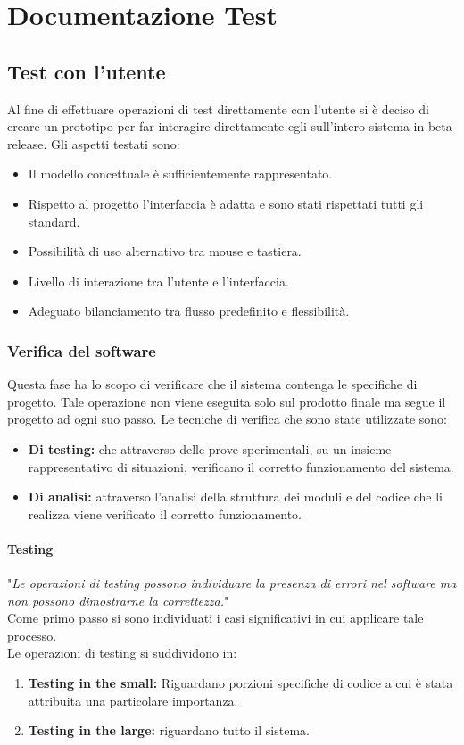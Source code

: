 \documentclass[a4paper,final,12pt]{report}
\begin{document}
\chapter{Documentazione Test}

\section{Test con l'utente}
Al fine di effettuare operazioni di test direttamente con l'utente si è deciso di creare un prototipo per far interagire direttamente egli sull'intero sistema in beta-release.
Gli aspetti testati sono:
\begin{itemize}
\item Il modello concettuale è sufficientemente rappresentato.
\item Rispetto al progetto l'interfaccia è adatta e sono stati rispettati tutti gli standard.
\item Possibilità di uso alternativo tra mouse e tastiera.
\item Livello di interazione tra l'utente e l'interfaccia.
\item Adeguato bilanciamento tra flusso predefinito e flessibilità.
\end{itemize}

\subsection{Verifica del software}
Questa fase ha lo scopo di verificare che il sistema contenga le specifiche di progetto. Tale operazione non viene eseguita solo sul prodotto finale ma segue il progetto ad ogni suo passo.
Le tecniche di verifica che sono state utilizzate sono:
\begin{itemize}
\item \textbf{Di testing:} che attraverso delle prove sperimentali, su un insieme rappresentativo di situazioni, verificano il corretto funzionamento del sistema. 
\item \textbf{Di analisi:} attraverso l'analisi della struttura dei moduli e del codice che li realizza viene verificato il corretto funzionamento. 
\end{itemize}

\subsubsection{Testing}
"\textit{Le operazioni di testing possono individuare la presenza di errori nel software ma non possono dimostrarne la correttezza.}"\cite{1}\\
Come primo passo si sono individuati i casi significativi in cui applicare tale processo.\\
Le operazioni di testing si suddividono in:
\begin{enumerate}
\item \textbf{Testing in the small:} Riguardano porzioni specifiche di codice a cui è stata attribuita una particolare importanza.
\item \textbf{Testing in the large:} riguardano tutto il sistema.
\end{enumerate}
\end{document}
